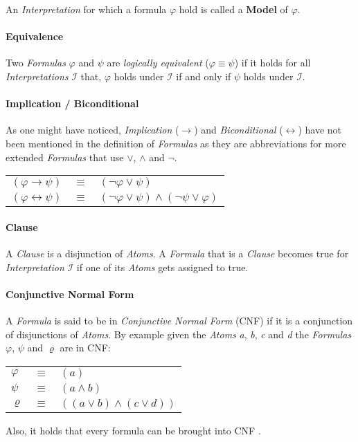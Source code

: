 An \emph{Interpretation} for which a formula $\varphi$ hold is called a \textbf{Model} of $\varphi$.

\paragraph{Equivalence}
Two \emph{Formulas} $\varphi$ and $\psi$ are \emph {logically equivalent} ($\varphi \equiv \psi$) if it holds for all \emph{Interpretations} $\mathcal{I}$ that, $\varphi$ holds under $\mathcal{I}$ if and only if $\psi$ holds under $\mathcal{I}$.

\paragraph{Implication / Biconditional}
As one might have noticed, \emph{Implication} ($\rightarrow$) and \emph{Biconditional} ($\leftrightarrow$) have not been mentioned in the definition of \emph{Formulas} as they are abbreviations for more extended \emph{Formulas} that use $\lor$, $\land$ and $\neg$.
\begin{center}
\begin{tabular}{ l l l }
    $(\varphi \rightarrow \psi)$ & $\equiv$ & $(\neg\varphi \lor \psi)$\\
    $(\varphi \leftrightarrow \psi)$ & $\equiv$ & $(\neg\varphi \lor \psi) \land (\neg\psi \lor \varphi)$\\
\end{tabular}
\end{center}

\paragraph{Clause}
A \emph{Clause} is a disjunction of \emph{Atoms}. A \emph{Formula} that is a \emph{Clause} becomes true for \emph{Interpretation} $\mathcal{I}$ if one of its \emph{Atoms} gets assigned to true.

\paragraph{Conjunctive Normal Form}
A \emph{Formula} is said to be in \emph{Conjunctive Normal Form} (CNF) if it is a conjunction of disjunctions of \emph{Atoms}. 
By example given the \emph{Atoms} \emph{a}, \emph{b}, \emph{c} and \emph{d} the \emph{Formulas} $\varphi$, $\psi$ and $\varrho$ are in CNF:
\begin{center}
    \begin{tabular}{ l l l }
    $\varphi$ & $\equiv$ & $(a)$\\
    $\psi$ & $\equiv$ & $(a \land b)$\\
    $\varrho$ & $\equiv$ & $((a \lor b) \land (c \lor d))$\\
\end{tabular}
\end{center}
Also, it holds that every formula can be brought into CNF \cite{ArtificialAModernApproach}.